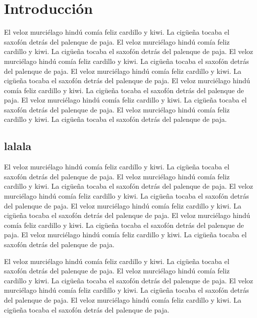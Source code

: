 \documentclass[a4paper,11pt,oneside]{report}
\begin{document}
\clearpage

\tableofcontents

\clearpage

\setcounter{page}{1}
\pagestyle{fancy}

\chapter{Introducción}

El veloz murciélago hindú comía feliz cardillo y kiwi. La cigüeña tocaba el
saxofón detrás del palenque de paja.
El veloz murciélago hindú comía feliz cardillo y kiwi. La cigüeña tocaba el
saxofón detrás del palenque de paja.
El veloz murciélago hindú comía feliz cardillo y kiwi. La cigüeña tocaba el
saxofón detrás del palenque de paja.
El veloz murciélago hindú comía feliz cardillo y kiwi. La cigüeña tocaba el
saxofón detrás del palenque de paja.
El veloz murciélago hindú comía feliz cardillo y kiwi. La cigüeña tocaba el
saxofón detrás del palenque de paja.
El veloz murciélago hindú comía feliz cardillo y kiwi. La cigüeña tocaba el
saxofón detrás del palenque de paja.
El veloz murciélago hindú comía feliz cardillo y kiwi. La cigüeña tocaba el
saxofón detrás del palenque de paja.

\section{lalala}
El veloz murciélago hindú comía feliz cardillo y kiwi. La cigüeña tocaba el
saxofón detrás del palenque de paja.
El veloz murciélago hindú comía feliz cardillo y kiwi. La cigüeña tocaba el
saxofón detrás del palenque de paja.
El veloz murciélago hindú comía feliz cardillo y kiwi. La cigüeña tocaba el
saxofón detrás del palenque de paja.
El veloz murciélago hindú comía feliz cardillo y kiwi. La cigüeña tocaba el
saxofón detrás del palenque de paja.
El veloz murciélago hindú comía feliz cardillo y kiwi. La cigüeña tocaba el
saxofón detrás del palenque de paja.
El veloz murciélago hindú comía feliz cardillo y kiwi. La cigüeña tocaba el
saxofón detrás del palenque de paja.

El veloz murciélago hindú comía feliz cardillo y kiwi. La cigüeña tocaba el
saxofón detrás del palenque de paja.
El veloz murciélago hindú comía feliz cardillo y kiwi. La cigüeña tocaba el
saxofón detrás del palenque de paja.
El veloz murciélago hindú comía feliz cardillo y kiwi. La cigüeña tocaba el
saxofón detrás del palenque de paja.
El veloz murciélago hindú comía feliz cardillo y kiwi. La cigüeña tocaba el
saxofón detrás del palenque de paja.
\end{document}
